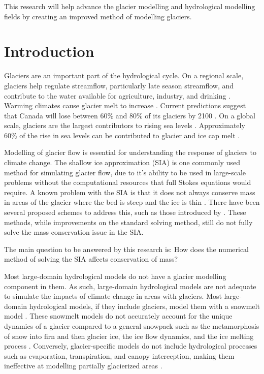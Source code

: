\documentclass{article}
\begin{document}
This research will help advance the glacier modelling and hydrological modelling fields by creating an improved method of modelling glaciers. 

\newpage
\section{Introduction}
Glaciers are an important part of the hydrological cycle. On a regional scale, glaciers help regulate streamflow, particularly late season streamflow, and contribute to the water available for agriculture, industry, and drinking \citep{Naz2014, Kaser2010, Meier2007}. Warming climates cause glacier melt to increase \citep{Meier2007, Clarke2015, Kaser2010}. Current predictions suggest that Canada will lose between 60\% and 80\% of its glaciers by 2100 \citep{Clarke2015}. On a global scale,  glaciers are the largest contributors to rising sea levels \citep{Marzeion2012}. Approximately 60\% of the rise in sea levels can be contributed to glacier and ice cap melt \citep{Meier2007}.

Modelling of glacier flow is essential for understanding the response of glaciers to climate change. The shallow ice approximation (SIA) is one commonly used method for simulating glacier flow, due to it's ability to be used in large-scale problems without the computational resources that full Stokes equations would require. A known problem with the SIA is that it does not always conserve mass in areas of the glacier where the bed is steep and the ice is thin \citep{Jarosch2013, Hindmarsh1996}. There have been several proposed schemes to address this, such as those introduced by \citet{Jarosch2013, Clarke2015}. These methods, while improvements on the standard solving method, still do not fully solve the mass conservation issue in the SIA. 

The main question to be answered by this research is: How does the numerical method of solving the SIA affects conservation of mass? 

Most large-domain hydrological models do not have a glacier modelling component in them. As such, large-domain hydrological models are not adequate to simulate the impacts of climate change in areas with glaciers. Most large-domain hydrological models, if they include glaciers, model them with a snowmelt model \citep{Pradhananga2020, Naz2014}. These snowmelt models do not accurately account for the unique dynamics of a glacier compared to a general snowpack such as the metamorphosis of snow into firn and then glacier ice, the ice flow dynamics, and the ice melting process \citep{Pradhananga2020}. Conversely, glacier-specific models do not include hydrological processes such as evaporation, transpiration, and canopy interception, making them ineffective at modelling partially glacierized areas \citep{Clarke2015, Maussion2019, Rounce2020}. 
\end{document}
